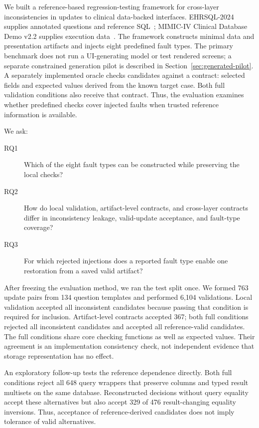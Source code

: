 \documentclass[manuscript,review,anonymous]{acmart}
\begin{document}
We built a reference-based regression-testing framework for cross-layer inconsistencies in updates to clinical data-backed interfaces. EHRSQL-2024 supplies annotated questions and reference SQL~\cite{lee2024ehrsql}; MIMIC-IV Clinical Database Demo v2.2 supplies execution data~\cite{johnson2023mimic}. The framework constructs minimal data and presentation artifacts and injects eight predefined fault types. The primary benchmark does not run a UI-generating model or test rendered screens; a separate constrained generation pilot is described in Section~\ref{sec:generated-pilot}. A separately implemented oracle checks candidates against a contract: selected fields and expected values derived from the known target case. Both full validation conditions also receive that contract. Thus, the evaluation examines whether predefined checks cover injected faults when trusted reference information is available.

We ask:

\begin{description}
  \item[RQ1] Which of the eight fault types can be constructed while preserving the local checks?
  \item[RQ2] How do local validation, artifact-level contracts, and cross-layer contracts differ in inconsistency leakage, valid-update acceptance, and fault-type coverage?
  \item[RQ3] For which rejected injections does a reported fault type enable one restoration from a saved valid artifact?
\end{description}

After freezing the evaluation method, we ran the test split once. We formed 763 update pairs from 134 question templates and performed 6,104 validations. Local validation accepted all inconsistent candidates because passing that condition is required for inclusion. Artifact-level contracts accepted 367; both full conditions rejected all inconsistent candidates and accepted all reference-valid candidates. The full conditions share core checking functions as well as expected values. Their agreement is an implementation consistency check, not independent evidence that storage representation has no effect.

An exploratory follow-up tests the reference dependence directly. Both full conditions reject all 648 query wrappers that preserve columns and typed result multisets on the same database. Reconstructed decisions without query equality accept these alternatives but also accept 329 of 476 result-changing equality inversions. Thus, acceptance of reference-derived candidates does not imply tolerance of valid alternatives.
\end{document}

